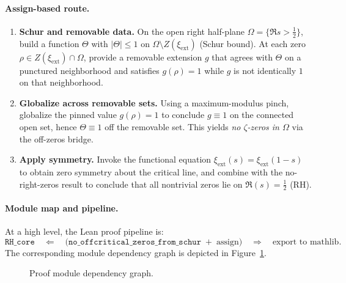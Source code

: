 \documentclass[11pt]{article}
\theoremstyle{plain}
\theoremstyle{definition}
\begin{document}
\paragraph{Assign-based route.}
\begin{enumerate}
  \item \textbf{Schur and removable data.} On the open right half-plane \(\Omega=\{ \Re s > \tfrac12 \}\), build a function \(\Theta\) with \(|\Theta|\le 1\) on \(\Omega\setminus Z(\xi_{\mathrm{ext}})\) (Schur bound). At each zero \(\rho\in Z(\xi_{\mathrm{ext}})\cap\Omega\), provide a removable extension \(g\) that agrees with \(\Theta\) on a punctured neighborhood and satisfies \(g(\rho)=1\) while \(g\) is not identically \(1\) on that neighborhood.
  \item \textbf{Globalize across removable sets.} Using a maximum-modulus pinch, globalize the pinned value \(g(\rho)=1\) to conclude \(g\equiv 1\) on the connected open set, hence \(\Theta\equiv 1\) off the removable set. This yields \emph{no \(\zeta\)-zeros in \(\Omega\)} via the off-zeros bridge.
  \item \textbf{Apply symmetry.} Invoke the functional equation \(\xi_{\mathrm{ext}}(s)=\xi_{\mathrm{ext}}(1-s)\) to obtain zero symmetry about the critical line, and combine with the no-right-zeros result to conclude that all nontrivial zeros lie on \(\Re(s)=\tfrac12\) (RH).
\end{enumerate}

\paragraph{Module map and pipeline.}
At a high level, the Lean proof pipeline is:
\[
  \texttt{RH\_core}
  \quad\Leftarrow\quad
  \bigl(\texttt{no\_offcritical\_zeros\_from\_schur} \;+\; \text{assign}\bigr)
  \quad\Rightarrow\quad
  \text{export to mathlib}.
\]
The corresponding module dependency graph is depicted in Figure~\ref{fig:proof-map}.

\begin{figure}[t]
  \centering
  \caption{Proof module dependency graph.}
  \label{fig:proof-map}
\end{figure}
\end{document}
